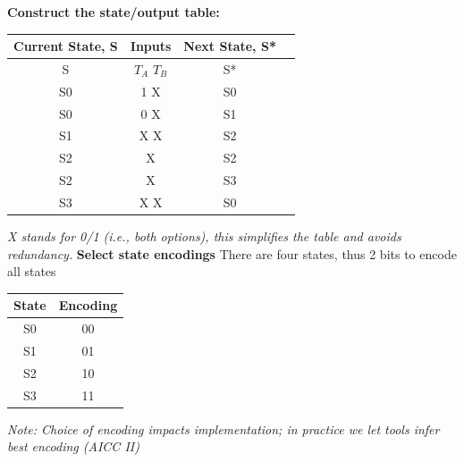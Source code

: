 \documentclass[12pt,openany]{book}
\begin{document}
\vspace*{5px}
\newline
\textbf{Construct the state/output table:}
\newline
\begin{center}
	\begin{tabular}{|c|c|c|c|}
		\hline
		\textbf{Current State, S} & \textbf{Inputs} & \textbf{Next State, S*} \\
		\hline
		S & $T_A$ \; $T_B$ & S* \\
		\hline
		S0 & 1 \; X & S0 \\
		S0 & 0 \; X & S1 \\
		S1 & X \; X & S2 \\
		S2 & X \; 1 & S2 \\
		S2 & X \; 0 & S3 \\
		S3 & X \; X & S0 \\
		\hline
	\end{tabular}
\end{center}
\textit{X stands for 0/1 (i.e., both options), this simplifies the table and avoids redundancy.}
\vspace*{10px}
\newline
\textbf{Select state encodings} \newline
There are four states, thus 2 bits to encode all states
\begin{center}
	\begin{tabular}{|c|c|}
		\hline
		\textbf{State} & \textbf{Encoding} \\
		\hline
		S0 & 00 \\
		S1 & 01 \\
		S2 & 10 \\
		S3 & 11 \\
		\hline
	\end{tabular}
\end{center}
\textit{Note: Choice of encoding impacts implementation; in practice we let tools infer best encoding (AICC II)}
\end{document}
